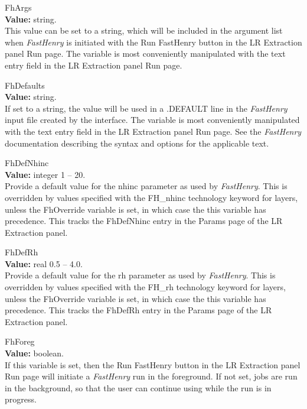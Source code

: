 \begin{description}
\item{\et FhArgs}\\
{\bf Value:} string.\\
This value can be set to a string, which will be included in the
argument list when {\it FastHenry} is initiated with the {\cb Run
FastHenry} button in the {\cb LR Extraction} panel {\cb Run}
page.  The variable is most conveniently manipulated with the text
entry field in the {\cb LR Extraction} panel {\cb Run} page.

\item{\et FhDefaults}\\
{\bf Value:} string.\\
If set to a string, the value will be used in a {\vt .DEFAULT} line in
the {\it FastHenry} input file created by the interface.  The variable
is most conveniently manipulated with the text entry field in the {\cb
LR Extraction} panel {\cb Run} page.  See the {\it FastHenry}
documentation describing the syntax and options for the applicable
text.

\item{\et FhDefNhinc}\\
{\bf Value:} integer 1 -- 20.\\
Provide a default value for the {\vt nhinc} parameter as used by {\it
FastHenry\/}.  This is overridden by values specified with the {\vt
FH\_nhinc} technology keyword for layers, unless the {\et FhOverride}
variable is set, in which case the this variable has precedence.  This
tracks the {\cb FhDefNhinc} entry in the {\cb Params} page of the {\cb
LR Extraction} panel.

\item{\et FhDefRh}\\
{\bf Value:} real 0.5 -- 4.0.\\
Provide a default value for the {\vt rh} parameter as used by {\it
FastHenry\/}.  This is overridden by values specified with the {\vt
FH\_rh} technology keyword for layers, unless the {\et FhOverride}
variable is set, in which case the this variable has precedence.  This
tracks the {\cb FhDefRh} entry in the {\cb Params} page of the {\cb LR
Extraction} panel.

\item{\et FhForeg}\\
{\bf Value:} boolean.\\
If this variable is set, then the {\cb Run FastHenry} button in the
{\cb LR Extraction} panel {\cb Run} page will initiate a {\it
FastHenry} run in the foreground.  If not set, jobs are run in the
background, so that the user can continue using {\Xic} while the run
is in progress.


\end{description}
